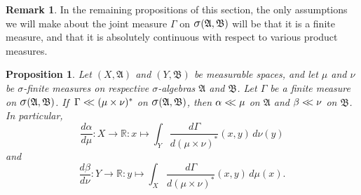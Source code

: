 \documentclass[
twoside=true,
paper=letter,
fontsize=9pt,
pagesize=auto,
leqno,
openany,
headsepline,
overfullrule,
]{scrbook}
\theoremstyle{plain}
\theoremstyle{plain}
\newtheorem{prop}[thm]{Proposition}
\theoremstyle{definition}
\newtheorem{rmk}[thm]{Remark}
\theoremstyle{bfnoteitalic}
\theoremstyle{bfnoteroman}
\newcommand{\sigalg}[1]{\mathfrak{#1}}
\newcommand{\sagb}{\mathop{\hbox{\large{$\sigma$}}}\nolimits}
\newcommand{\textsigma}{\hbox{\large{$\sigma$}}\kern-1pt}
\newcommand{\R}{\mathbb{R}}
\newcommand{\sigmaalgebra}{\sigalg{A}}
\newcommand{\sigmaalgebraii}{\sigalg{B}}
\newcommand{\productsig}[2]{\sagb(#1,#2)}
\newcommand{\measurespace}{X}
\newcommand{\measurespaceii}{Y}
\newcommand{\mspaceelt}{x}
\newcommand{\mspaceeltii}{y}
\newcommand{\abscont}{\mathrel{< \kern-3.5pt <}}
\newcommand{\measure}{\mu}
\newcommand{\measmu}{\mu}
\newcommand{\measureii}{\nu}
\newcommand{\measnu}{\nu}
\newcommand{\joint}{\Gamma}%
\newcommand{\measonprod}{\Gamma}%
\newcommand{\marginalone}{\alpha}%
\newcommand{\marginaltwo}{\beta}%
\begin{document}
\begin{rmk}
In the remaining propositions of this section,
the only assumptions we will make about the joint measure $\measonprod$ on $\productsig{\sigmaalgebra}{\sigmaalgebraii}$ will be that it is a finite measure, and that it is absolutely continuous with respect to various product measures.
\end{rmk}






\begin{prop}\label{marginal_abscont}
Let 
$(\measurespace, \sigmaalgebra)$
and
$(\measurespaceii, \sigmaalgebraii)$
be measurable spaces, and let $\measure$ and $\measureii$
be \textsigma-finite measures on respective \textsigma-algebras 
$\sigmaalgebra$ and $\sigmaalgebraii$.
Let $\measonprod$ be a finite measure on 
$\productsig{\sigmaalgebra}{\sigmaalgebraii}$. 
If $\,\measonprod \abscont (\measure\times\measureii)^*$ on
$\productsig{\sigmaalgebra}{\sigmaalgebraii}$, 
then 
$\marginalone\abscont\measure$
on $\sigmaalgebra$
and
$\marginaltwo\abscont\measureii$
on $\sigmaalgebraii$.
In particular,
\[
\frac{d \marginalone}
{d\measure}
: \measurespace\to\R :
\mspaceelt\mapsto
\int_{\measurespaceii}
\frac{d\joint}{d(\measmu\times\measnu)^*}
(\mspaceelt,\mspaceeltii)
\,d\measureii(\mspaceeltii)
\]
and
\[
\frac{d \marginaltwo}
{d\measureii}
: \measurespaceii\to\R :
\mspaceeltii\mapsto
\int_{\measurespace}
\frac{d\joint}{d(\measmu\times\measnu)^*}
(\mspaceelt,\mspaceeltii)\,d\measure(\mspaceelt).
\]
\end{prop}
\end{document}
